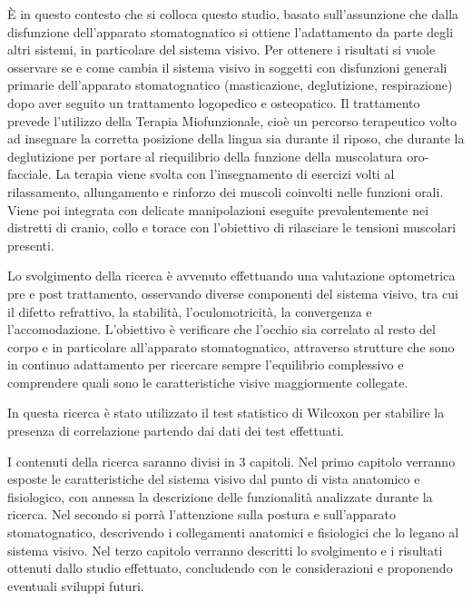 È in questo contesto che si colloca questo studio, basato sull'assunzione che dalla disfunzione dell'apparato stomatognatico si ottiene l'adattamento da parte degli altri sistemi, in particolare del sistema visivo. Per ottenere i risultati si vuole osservare se e come cambia il sistema visivo in soggetti con disfunzioni generali primarie dell'apparato stomatognatico (masticazione, deglutizione, respirazione) dopo aver seguito un trattamento logopedico e osteopatico. Il trattamento prevede l'utilizzo della Terapia Miofunzionale, cioè un percorso terapeutico volto ad insegnare la corretta posizione della lingua sia durante il riposo, che durante la deglutizione per portare al riequilibrio della funzione della muscolatura oro-facciale. La terapia viene svolta con l'insegnamento di esercizi volti al rilassamento, allungamento e rinforzo dei muscoli coinvolti nelle funzioni orali.  Viene poi integrata con delicate manipolazioni eseguite prevalentemente nei distretti di cranio, collo e torace con l'obiettivo di rilasciare le tensioni muscolari presenti.

Lo svolgimento della ricerca è avvenuto effettuando una valutazione optometrica pre e post trattamento, osservando diverse componenti del sistema visivo, tra cui il difetto refrattivo, la stabilità, l'oculomotricità, la convergenza e l'accomodazione.
L'obiettivo è verificare che l'occhio sia correlato al resto del corpo e in particolare all'apparato stomatognatico, attraverso strutture che sono in continuo adattamento per ricercare sempre l'equilibrio complessivo e comprendere quali sono le caratteristiche visive maggiormente collegate. 

In questa ricerca è stato utilizzato il test statistico di Wilcoxon per stabilire la presenza di correlazione
partendo dai dati dei test effettuati.

I contenuti della ricerca saranno divisi in 3 capitoli. Nel primo capitolo verranno esposte le caratteristiche del sistema visivo dal punto di vista anatomico e fisiologico, con annessa la descrizione delle funzionalità analizzate durante la ricerca. Nel secondo si porrà l'attenzione sulla postura e sull'apparato stomatognatico, descrivendo i collegamenti anatomici e fisiologici che lo legano al sistema visivo. Nel terzo capitolo verranno descritti lo svolgimento e i risultati ottenuti dallo studio effettuato, concludendo con le considerazioni e proponendo eventuali sviluppi futuri.
